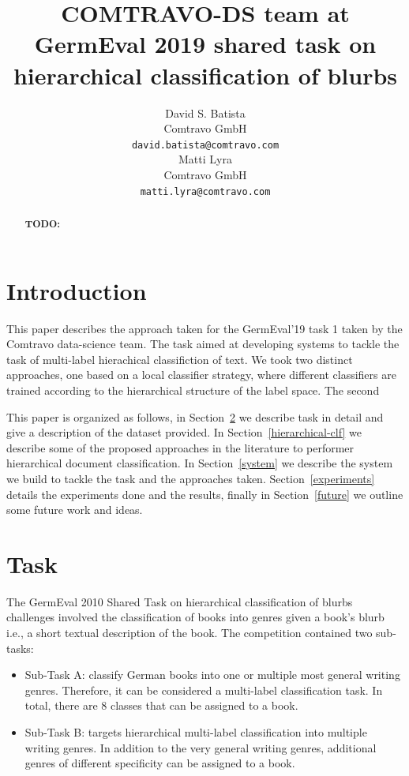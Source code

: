 \documentclass[11pt,a4paper]{article}
\title{COMTRAVO-DS team at GermEval 2019 shared task on hierarchical classification of blurbs}
\author{David S. Batista \\
  Comtravo GmbH \\
  {\tt david.batista@comtravo.com} \\\And
  Matti Lyra \\
  Comtravo GmbH \\
  {\tt matti.lyra@comtravo.com} \\}
\date{}
\begin{document}
\maketitle
\begin{abstract}
\textbf{TODO:}
\ \newline
\end{abstract}


\section{Introduction}

This paper describes the approach taken for the GermEval'19 task 1 taken by the Comtravo data-science team.
The task aimed at developing systems to tackle the task of multi-label hierachical classifiction of text.
We took two distinct approaches, one based on a local classifier strategy, where different classifiers are
trained according to the hierarchical structure of the label space. The second


This paper is organized as follows, in Section~\ref{task} we describe task in detail and give a
description of the dataset provided. In Section~\ref{hierarchical-clf} we describe some of the
proposed approaches in the literature to performer hierarchical document classification.
In Section~\ref{system} we describe the system we build to tackle the task and the approaches taken.
Section~\ref{experiments} details the experiments done and the results, finally in
Section~\ref{future} we outline some future work and ideas.

\section{Task}\label{task}

The GermEval 2010 Shared Task on hierarchical classification of blurbs challenges involved the
classification of books into genres given a book's blurb i.e., a short textual description of the
book. The competition contained two sub-tasks:

\begin{itemize}

\item Sub-Task A: classify German books into one or multiple most general writing genres. Therefore,
it can be considered a multi-label classification task. In total, there are 8 classes that can be
assigned to a book.

\item Sub-Task B: targets hierarchical multi-label classification into multiple writing genres. In
addition to the very general writing genres, additional genres of different specificity can
be assigned to a book.

\end{itemize}
\end{document}

